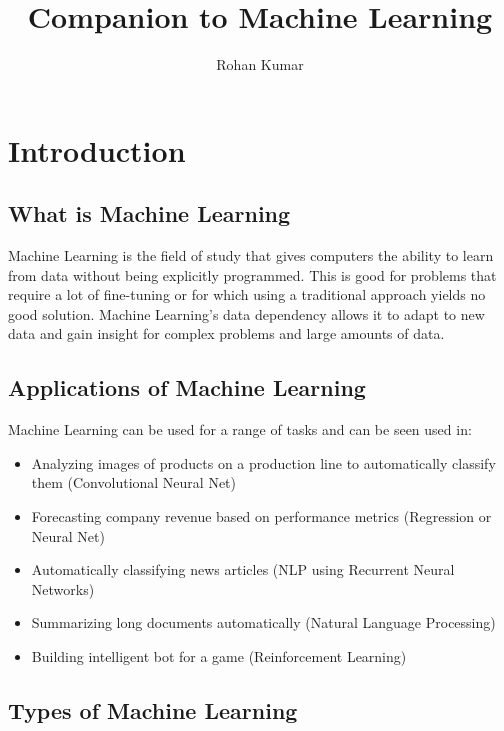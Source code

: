 \documentclass[12pt]{article}
\title{Companion to Machine Learning}
\author{Rohan Kumar}
\date{}
\begin{document}
\maketitle
\newpage
\tableofcontents
\newpage

\section*{Introduction}

\subsection{What is Machine Learning}
    Machine Learning is the field of study that gives computers the ability to learn from data without being 
    explicitly programmed. This is good for problems that require a lot of fine-tuning or for which using a 
    traditional approach yields no good solution. Machine Learning's data dependency allows it to adapt to new data
    and gain insight for complex problems and large amounts of data.

\subsection{Applications of Machine Learning}
    Machine Learning can be used for a range of tasks and can be seen used in:
    \begin{itemize}
        \item Analyzing images of products on a production line to automatically classify them (Convolutional Neural Net)
        \item Forecasting company revenue based on performance metrics (Regression or Neural Net)
        \item Automatically classifying news articles (NLP using Recurrent Neural Networks)
        \item Summarizing long documents automatically (Natural Language Processing)
        \item Building intelligent bot for a game (Reinforcement Learning)
    \end{itemize}

\subsection{Types of Machine Learning}
\end{document}
